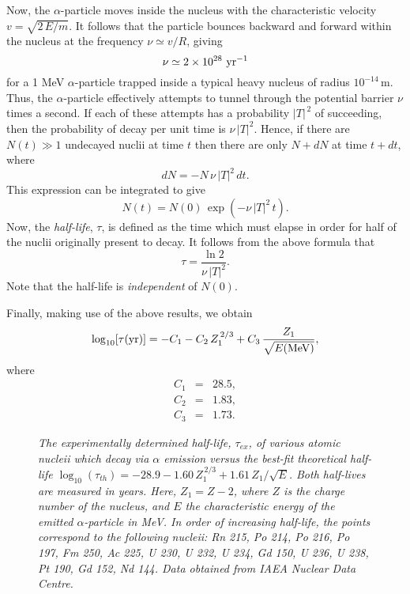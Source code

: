 Now, the $\alpha$-particle moves inside the nucleus with the characteristic
velocity $v= \sqrt{2\,E/m}$. It follows that the particle bounces backward
and forward within the nucleus at the frequency 
$\nu\simeq v/R$, giving
\begin{equation}
\nu\simeq 2\times 10^{28}\,\,{\rm yr}^{-1}
\end{equation}
for a 1 MeV $\alpha$-particle trapped inside a typical  heavy nucleus of radius $10^{-14}$\,m.
Thus, the $\alpha$-particle effectively attempts to tunnel through the potential
barrier $\nu$ times a second. If each of these attempts has a probability
$|T|^{\,2}$ of succeeding, then the probability of decay per unit time
is $\nu\,|T|^2$. Hence, if there are $N(t)\gg 1$ undecayed nuclii at time $t$ then
there are only $N+dN$ at time $t+dt$, where
\begin{equation}
dN = - N\,\nu\,|T|^2\,dt.
\end{equation}
This expression can be integrated to give
\begin{equation}
N(t) = N(0)\,\exp(-\nu\,|T|^2\,t).
\end{equation}
Now, the {\em half-life}, $\tau$,  is defined as the time  which must elapse
in order for half of the nuclii originally present to decay. It follows from
the above formula that
\begin{equation}
\tau = \frac{\ln 2}{\nu\,|T|^2}.
\end{equation}
Note that the half-life is {\em independent}\/ of $N(0)$.

Finally, making use of the above results, we obtain
\begin{equation}\label{e5.64}
\log_{10}[\tau ({\rm yr})] = -C_1 - C_2\,Z_1^{\,2/3} + C_3\,\frac{Z_1}{\sqrt{E({\rm MeV})}},
\end{equation}
where
\begin{eqnarray}
C_1 &= &28.5,\\[0.5ex]
C_2 &=& 1.83,\\[0.5ex]
C_3 &=& 1.73.
\end{eqnarray}
 
\begin{figure}
\epsfysize=4in
\centerline{}
\caption{\em The experimentally determined half-life, $\tau_{ex}$, of various atomic nucleii which decay via $\alpha$ emission versus the best-fit theoretical half-life $\log_{10}(\tau_{th}) = -28.9 - 1.60\,Z_1^{\,2/3} + 1.61\,Z_1/\sqrt{E}$. Both half-lives are measured in years. Here, $Z_1=Z-2$, where $Z$ is the charge number of the nucleus, and $E$ the characteristic energy of the emitted $\alpha$-particle in MeV. In
order of increasing half-life, the points correspond to the
following nucleii: Rn 215, Po 214, Po 216, Po 197, Fm 250, Ac 225, U 230, U 232, U 234, Gd 150, U 236, U 238, Pt 190, Gd 152, Nd 144. Data obtained from IAEA Nuclear Data Centre.}\label{fal}   
\end{figure}

